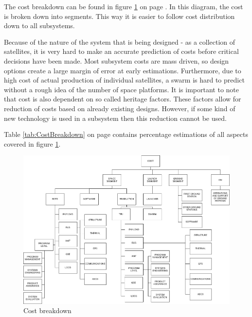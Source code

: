 The cost breakdown can be found in figure \ref{fig:costbreak} on page \pageref{fig:costbreak}. In this diagram, the cost is broken down into segments. This way it is easier to follow cost distribution down to all subsystems.

Because of the nature of the system that is being designed - as a collection of satellites, it is very hard to make an accurate prediction of costs before critical decisions have been made. Most subsystem costs are mass driven, so design options create a large margin of error at early estimations. Furthermore, due to high cost of actual production of individual satellites, a swarm is hard to predict without a rough idea of the number of space platforms. It is important to note that cost is also dependent on so called heritage factors. These factors allow for reduction of costs based on already existing designs. However, if some kind of new technology is used in a subsystem then this reduction cannot be used.

Table \ref{tab:CostBreakdown} on page \pageref{tab:CostBreakdown} contains percentage estimations of all aspects covered in figure \ref{fig:costbreak}.

\begin{figure}[H]
\begin{center}

\includegraphics[width=1.0\textwidth,angle=90]{chapters/img/costbreakdown.jpg}
\caption{Cost breakdown}
\label{fig:costbreak}
\end{center}
\end{figure}

